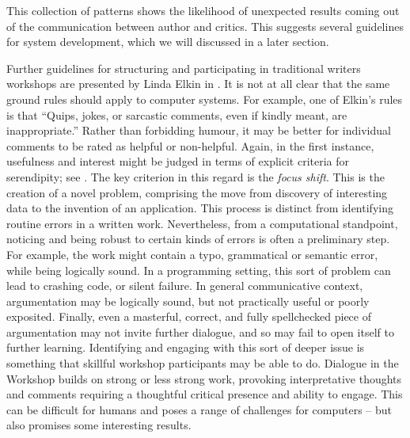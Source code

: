 This collection of patterns shows the likelihood of unexpected results 
coming out of the communication between author and critics.   This
suggests several guidelines for system development, which we will discussed
in a later section.

Further guidelines for structuring and participating in traditional
writers workshops are presented by Linda Elkin in
\cite[pp. 201--203]{gabriel2002writer}.  It is not at all clear that
the same ground rules should apply to computer systems.  For example,
one of Elkin's rules is that ``Quips, jokes, or sarcastic comments,
even if kindly meant, are inappropriate.''  Rather than forbidding
humour, it may be better for individual comments to be rated as
helpful or non-helpful.  Again, in the first instance, usefulness
and interest might be judged in terms of explicit criteria for serendipity;
see \cite{corneli15cc,pease2013discussion}.
The key criterion in this regard is the \emph{focus shift}. 
This is the creation of a novel problem, comprising the move
from discovery of interesting data to the invention of an application.
This process is distinct from identifying routine errors in a written work.  Nevertheless, from a
computational standpoint, noticing and being robust to certain kinds
of errors is often a preliminary step.  For example, the work might
contain a typo, grammatical or semantic error, while being logically
sound.  In a programming setting, this sort of problem can lead to
crashing code, or silent failure.  In general communicative context,
argumentation may be logically sound, but not practically useful or
poorly exposited.  Finally, even a masterful, correct, and fully
spellchecked piece of argumentation may not invite further dialogue,
and so may fail to open itself to further learning.  Identifying and
engaging with this sort of deeper issue is something that skillful
workshop participants may be able to do.  Dialogue in the Workshop
builds on strong or less strong work, provoking interpretative
thoughts and comments requiring a thoughtful critical presence and
ability to engage.  This can be difficult for humans and poses a range
of challenges for computers -- but also promises some interesting
results.

\bigskip




